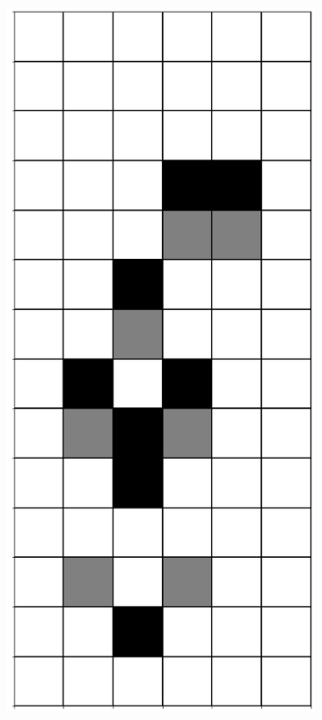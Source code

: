 \documentclass[12pt]{article}
\numberwithin{figure}{section} %
\begin{document}
\begin{figure}[H]
\begin{subfigure}{0.3\textwidth}
     \includegraphics[angle=270,width=\linewidth]{Section4/7.0}

\end{subfigure}
\end{figure}
\end{document}
